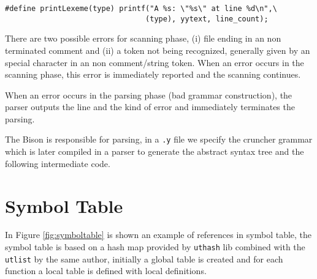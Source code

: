 \documentclass{article}
\begin{document}
\begin{verbatim}
#define printLexeme(type) printf("A %s: \"%s\" at line %d\n",\
                                (type), yytext, line_count);
\end{verbatim}

There are two possible errors for scanning phase, (i) file ending in an
non terminated comment and (ii) a token not being recognized, generally given by
an special character in an non comment/string token. When an error occurs in the
scanning phase, this error is immediately reported and the scanning continues.

When an error occurs in the parsing phase (bad grammar construction), the
parser outputs the line and the kind of error and immediately terminates the
parsing.

The Bison is responsible for parsing, in a \texttt{.y} file we specify the
cruncher grammar which is later compiled in a parser to generate the abstract
syntax tree and the following intermediate code.

\section{Symbol Table}
\label{sec:symtable}
In Figure \ref{fig:symboltable} is shown an example of references in symbol
table, the symbol table is based on a hash map provided by \texttt{uthash} lib
\cite{hanson2013uthash} combined with the \texttt{utlist} by the same author,
initially a global table is created and for each function a local table is
defined with local definitions.
\end{document}
